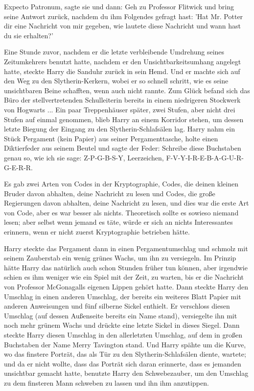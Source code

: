 \glqq{}Expecto Patronum\grqq{}, sagte sie und dann: \glqq{}Geh zu Professor
Flitwick und bring seine Antwort zurück, nachdem du ihm Folgendes gefragt hast:
'Hat Mr. Potter dir eine Nachricht von mir gegeben, wie lautete diese Nachricht
und wann hast du sie erhalten?'\grqq{}

Eine Stunde zuvor, nachdem er die letzte verbleibende Umdrehung seines
Zeitumkehrers benutzt hatte, nachdem er den Unsichtbarkeitsumhang angelegt
hatte, steckte Harry die Sanduhr zurück in sein Hemd. Und er machte sich auf den
Weg zu den Slytherin-Kerkern, wobei er so schnell schritt, wie es seine
unsichtbaren Beine schafften, wenn auch nicht rannte. Zum Glück befand sich das
Büro der stellvertretenden Schulleiterin bereits in einem niedrigeren Stockwerk
von Hogwarts ... Ein paar Treppenhäuser später, zwei Stufen, aber nicht drei
Stufen auf einmal genommen, blieb Harry an einem Korridor stehen, um dessen
letzte Biegung der Eingang zu den Slytherin-Schlafsälen lag. Harry nahm ein
Stück Pergament (kein Papier) aus seiner Pergamenttasche, holte einen
Diktierfeder aus seinem Beutel und sagte der Feder: \glqq{}Schreibe diese
Buchstaben genau so, wie ich sie sage: Z-P-G-B-S-Y, Leerzeichen,
F-V-Y-I-R-E-B-A-G-U-R-G-E-R-R.\grqq{}

Es gab zwei Arten von Codes in der Kryptographie, Codes, die deinen kleinen
Bruder davon abhalten, deine Nachricht zu lesen und Codes, die große Regierungen
davon abhalten, deine Nachricht zu lesen, und dies war die erste Art von Code,
aber es war besser als nichts. Theoretisch sollte es sowieso niemand lesen; aber
selbst wenn jemand es täte, würde er sich an nichts Interessantes erinnern, wenn
er nicht zuerst Kryptographie betrieben hätte.

Harry steckte das Pergament dann in einen Pergamentumschlag und schmolz mit
seinem Zauberstab ein wenig grünes Wachs, um ihn zu versiegeln. Im Prinzip hätte
Harry das natürlich auch schon Stunden früher tun können, aber irgendwie schien
es ihm weniger wie ein Spiel mit der Zeit, zu warten, bis er die Nachricht von
Professor McGonagalls eigenen Lippen gehört hatte. Dann steckte Harry den
Umschlag in einen anderen Umschlag, der bereits ein weiteres Blatt Papier mit
anderen Anweisungen und fünf silberne Sickel enthielt. Er verschloss diesen
Umschlag (auf dessen Außenseite bereits ein Name stand), versiegelte ihn mit
noch mehr grünem Wachs und drückte eine letzte Sickel in dieses Siegel. Dann
steckte Harry diesen Umschlag in den allerletzten Umschlag, auf dem in großen
Buchstaben der Name \glqq{}Merry Tavington\grqq{} stand. Und Harry spähte um die
Kurve, wo das finstere Porträt, das als Tür zu den Slytherin-Schlafsälen diente,
wartete; und da er nicht wollte, dass das Porträt sich daran erinnerte, dass es
jemanden unsichtbar gemacht hatte, benutzte Harry den Schwebezauber, um den
Umschlag zu dem finsteren Mann schweben zu lassen und ihn ihm anzutippen.

